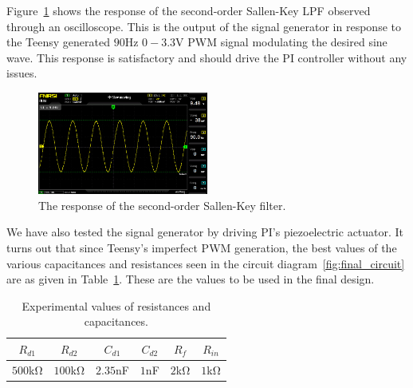 
Figure~\ref{fig:sallenkey_osc} shows the response of the second-order Sallen-Key
LPF observed through an oscilloscope. This is the output of the signal generator
in response to the Teensy generated $90$\unit{\hertz} $0-3.3$\unit{\volt} PWM
signal modulating the desired sine wave. This response is satisfactory and
should drive the PI controller without any issues.

\begin{figure}[bh]
    \includegraphics[width=0.5\textwidth]{./figures/output_osc.jpg}
    \caption{The response of the second-order Sallen-Key filter.}
    \label{fig:sallenkey_osc}
\end{figure}

We have also tested the signal generator by driving PI's piezoelectric actuator.
It turns out that since Teensy's imperfect PWM generation, the best values of
the various capacitances and resistances seen in the circuit
diagram~\ref{fig:final_circuit} are as given in Table~\ref{tab:values}. These
are the values to be used in the final design.


{\renewcommand{\arraystretch}{1.5}
\begin{table}
    \centering
    \caption{Experimental values of resistances and capacitances.}
    \begin{tabular}{*6c}
        \toprule
        $R_{d1}$ & $R_{d2}$ & $C_{d1}$ & $C_{d2}$ & $R_f$ & $R_{in}$ \\    
        \hline
        \midrule
        $500$\unit{\kilo\ohm} & $100$\unit{\kilo\ohm} & $2.35$\unit{\nano\farad}
          & $1$\unit{\nano\farad} & $2$\unit{\kilo\ohm} &
        $1$\unit{\kilo\ohm} \\
        \bottomrule
    \end{tabular}
    \label{tab:values}
    \vspace{-1em}
\end{table}
}

